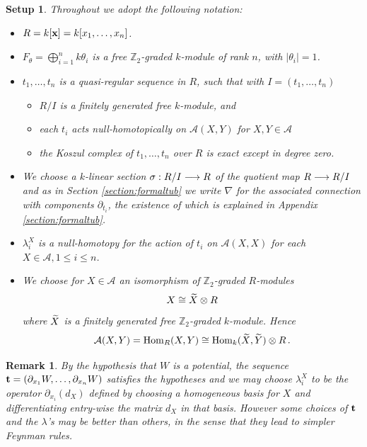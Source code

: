 \documentclass[english,letter paper,12pt,leqno]{article}
\newtheorem{setup}[theorem]{Setup}
\theoremstyle{example}
\newtheorem{remark}[theorem]{Remark}
\numberwithin{equation}{section}
\def\AA{\mathcal{A}}
\def\stab{\operatorname{stab}}
\def\Hom{\operatorname{Hom}}
\def\be{\begin{equation}}
\def\ee{\end{equation}}
\def\nZ{\mathds{Z}}
\begin{document}
\begin{setup}\label{setup:overall} Throughout we adopt the following notation:
\begin{itemize}
\item $R = k[\bold{x}] = k[x_1,\ldots,x_n]$.
\item $F_\theta = \bigoplus_{i=1}^n k\theta_i$ is a free $\mathbb{Z}_2$-graded $k$-module of rank $n$, with $|\theta_i| = 1$.
\item $t_1,\ldots,t_n$ is a quasi-regular sequence in $R$, such that with $I = (t_1,\ldots,t_n)$
\begin{itemize}
\item $R/I$ is a finitely generated free $k$-module, and
\item each $t_i$ acts null-homotopically on $\AA(X,Y)$ for $X,Y \in \AA$
\item the Koszul complex of $t_1,\ldots,t_n$ over $R$ is exact except in degree zero.
\end{itemize}
\item We choose a $k$-linear section $\sigma: R/I \longrightarrow R$ of the quotient map $R \longrightarrow R/I$ and as in Section \ref{section:formaltub} we write $\nabla$ for the associated connection with components $\partial_{t_i}$, the existence of which is explained in Appendix \ref{section:formaltub}.
\item $\lambda_i^X$ is a null-homotopy for the action of $t_i$ on $\AA(X,X)$ for each $X \in \AA, 1 \le i \le n$.
\item We choose for $X \in \AA$ an isomorphism of $\nZ_2$-graded $R$-modules
\[
X \cong \widetilde{X} \otimes R
\]
where $\widetilde{X}$ is a finitely generated free $\nZ_2$-graded $k$-module. Hence
\be
\AA(X,Y) = \Hom_R(X,Y) \cong \Hom_k(\coeff{X},\coeff{Y}) \otimes R\,.\label{eq:chosenCiso}
\ee
\end{itemize}
\end{setup}

\begin{remark} By the hypothesis that $W$ is a potential, the sequence $\bold{t} = (\partial_{x_1} W, \ldots, \partial_{x_n} W)$ satisfies the hypotheses and we may choose $\lambda_i^X$ to be the operator $\partial_{x_i}(d_X)$ defined by choosing a homogeneous basis for $X$ and differentiating entry-wise the matrix $d_X$ in that basis. However some choices of $\bold{t}$ and the $\lambda$'s may be better than others, in the sense that they lead to simpler Feynman rules.%
\end{remark}
\end{document}
